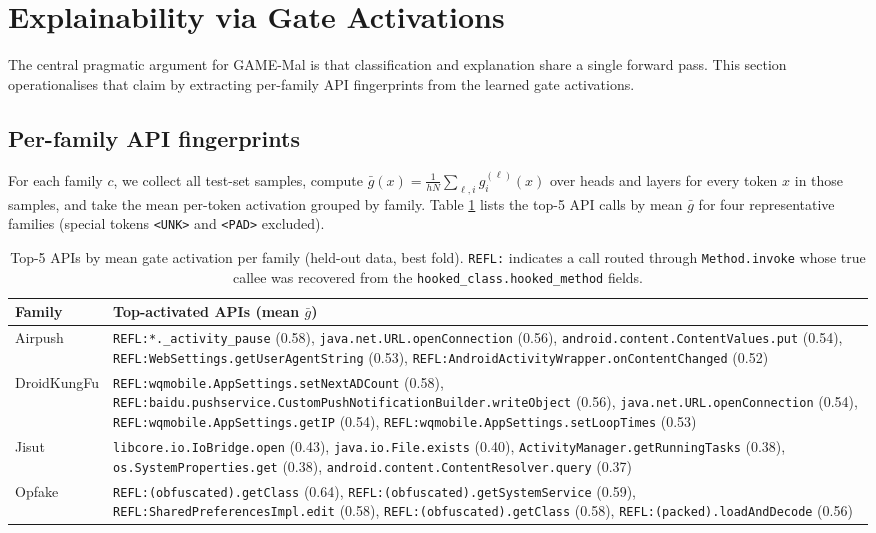\section{Explainability via Gate Activations}
\label{sec:explainability}

The central pragmatic argument for GAME-Mal is that classification
and explanation share a single forward pass. This section
operationalises that claim by extracting per-family API
fingerprints from the learned gate activations.

\subsection{Per-family API fingerprints}

For each family $c$, we collect all test-set samples, compute
$\bar{g}(x) = \frac{1}{hN}\sum_{\ell,i} g_i^{(\ell)}(x)$ over
heads and layers for every token $x$ in those samples, and take
the mean per-token activation grouped by family. Table
\ref{tab:fingerprints} lists the top-5 API calls by mean
$\bar{g}$ for four representative families (special
tokens \texttt{<UNK>} and \texttt{<PAD>} excluded).

\begin{table}[t]
\centering
\caption{Top-5 APIs by mean gate activation per family (held-out
data, best fold). \texttt{REFL:} indicates a call routed through
\texttt{Method.invoke} whose true callee was recovered from the
\texttt{hooked\_class.hooked\_method} fields.}
\label{tab:fingerprints}
\small
\begin{tabular}{p{}p{}}
\toprule
Family & Top-activated APIs (mean $\bar{g}$) \\
\midrule
Airpush &
\texttt{REFL:*.\_activity\_pause} (0.58),
\texttt{java.net.URL.openConnection} (0.56),
\texttt{android.content.ContentValues.put} (0.54),
\texttt{REFL:WebSettings.getUserAgentString} (0.53),
\texttt{REFL:AndroidActivityWrapper.onContentChanged} (0.52) \\[0.4em]
DroidKungFu &
\texttt{REFL:wqmobile.AppSettings.setNextADCount} (0.58),
\texttt{REFL:baidu.pushservice.CustomPushNotificationBuilder.writeObject} (0.56),
\texttt{java.net.URL.openConnection} (0.54),
\texttt{REFL:wqmobile.AppSettings.getIP} (0.54),
\texttt{REFL:wqmobile.AppSettings.setLoopTimes} (0.53) \\[0.4em]
Jisut &
\texttt{libcore.io.IoBridge.open} (0.43),
\texttt{java.io.File.exists} (0.40),
\texttt{ActivityManager.getRunningTasks} (0.38),
\texttt{os.SystemProperties.get} (0.38),
\texttt{android.content.ContentResolver.query} (0.37) \\[0.4em]
Opfake &
\texttt{REFL:(obfuscated).getClass} (0.64),
\texttt{REFL:(obfuscated).getSystemService} (0.59),
\texttt{REFL:SharedPreferencesImpl.edit} (0.58),
\texttt{REFL:(obfuscated).getClass} (0.58),
\texttt{REFL:(packed).loadAndDecode} (0.56) \\
\bottomrule
\end{tabular}
\end{table}

